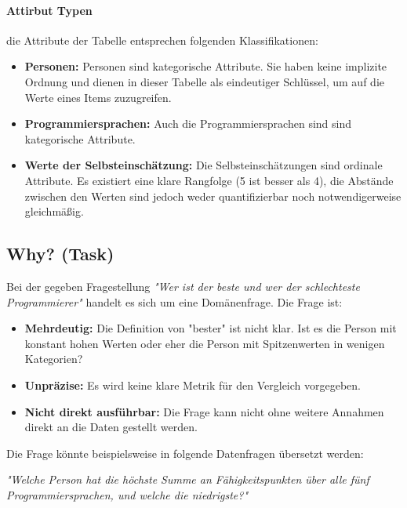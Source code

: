 \documentclass[12pt, a4paper]{article}
\begin{document}
\paragraph{Attirbut Typen}
die Attribute der Tabelle entsprechen folgenden Klassifikationen:
\begin{itemize}
  \item \textbf{Personen:} Personen sind kategorische Attribute. Sie haben keine implizite Ordnung und dienen in dieser Tabelle 
    als eindeutiger Schlüssel, um auf die Werte eines Items zuzugreifen.
  \item \textbf{Programmiersprachen:} Auch die Programmiersprachen sind sind kategorische Attribute.
  \item \textbf{Werte der Selbsteinschätzung:} Die Selbsteinschätzungen sind ordinale Attribute. Es existiert eine klare Rangfolge (5 ist besser als 4),
    die Abstände zwischen den Werten sind jedoch weder quantifizierbar noch notwendigerweise gleichmäßig.
\end{itemize}



\subsection*{Why? (Task)}
Bei der gegeben Fragestellung \emph{"Wer ist der beste und wer der schlechteste Programmierer"} handelt es sich um eine Domänenfrage.\newline
Die Frage ist:
\begin{itemize}
  \item \textbf{Mehrdeutig:} Die Definition von "bester" ist nicht klar. Ist es die Person mit konstant hohen Werten oder eher die Person mit Spitzenwerten
    in wenigen Kategorien?
  \item \textbf{Unpräzise:} Es wird keine klare Metrik für den Vergleich vorgegeben.
  \item \textbf{Nicht direkt ausführbar:} Die Frage kann nicht ohne weitere Annahmen direkt an die Daten gestellt werden.
\end{itemize}

Die Frage könnte beispielsweise in folgende Datenfragen übersetzt werden:
\begin{center}
  \textit{"Welche Person hat die höchste Summe an Fähigkeitspunkten über alle fünf Programmiersprachen, und welche die niedrigste?"}
\end{center}
\end{document}
